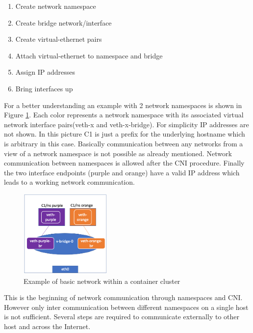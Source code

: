 \begin{enumerate}
\item Create network namespace
\item Create bridge network/interface
\item Create virtual-ethernet pairs
\item Attach virtual-ethernet to namespace and bridge
\item Assign IP addresses
\item Bring interfaces up
\end{enumerate}
For a better understanding an example with 2 network namespaces is shown in Figure \ref{sec:intro:containerization:linux_namespaces:netowork_ns}. Each color represents a network namespace with its associated virtual network interface pairs(veth-x and veth-x-bridge). For simplicity IP addresses are not shown. In this picture C1 is just a prefix for the underlying hostname which is arbitrary in this case. Basically communication between any networks from a view of a network namespace is not possible as already mentioned. Network communication between namespaces is allowed after the CNI procedure. Finally the two interface endpoints (purple and orange) have a valid IP address which leads to a working network communication.
\begin{figure}[htbp]
 \centering
 \includegraphics[width=0.4\textwidth]{gfx/examples/network_ns}
 \caption{Example of basic network within a container cluster}
\label{sec:intro:containerization:linux_namespaces:netowork_ns}
\end{figure}
This is the beginning of network communication through namespaces and CNI. However only inter communication between different namespaces on a single host is not sufficient. Several steps are required to communicate externally to other host and across the Internet.

